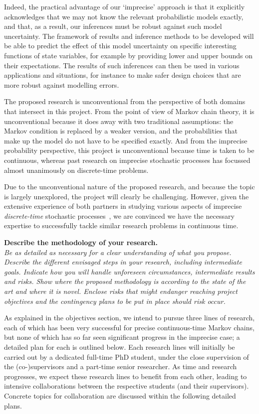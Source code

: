 \documentclass[11pt,dvipsnames,usenames,a4paper]{article}
\begin{document}
Indeed, the practical advantage of our `imprecise' approach is that it explicitly acknowledges that we may not know the relevant probabilistic models exactly, and that, as a result, our inferences must be robust against such model uncertainty. 
The framework of results and inference methods to be developed will be able to predict the effect of this model uncertainty on specific interesting functions of state variables, for example by providing lower and upper bounds on their expectations. 
The results of such inferences can then be used in various applications and situations, for instance to make safer design choices that are more robust against modelling errors.

The proposed research is unconventional from the perspective of both domains that intersect in this project.
From the point of view of Markov chain theory, it is unconventional because it does away with two traditional assumptions: the Markov condition is replaced by a weaker version, and the probabilities that make up the model do not have to be specified exactly. 
And from the imprecise probability perspective, this project is unconventional because time is taken to be continuous, whereas past research on imprecise stochastic processes has focussed almost unanimously on discrete-time problems.

Due to the unconventional nature of the proposed research, and because the topic is largely unexplored, the project will clearly be challenging. 
However, given the extensive experience of both partners in studying various aspects of imprecise \emph{discrete-time} stochastic processes~\cite{cooman2007d,cooman2008,hermans2012,cooman2015:markovergodic}, we are convinced we have the necessary expertise to successfully tackle similar research problems in continuous time.


\vspace{7pt}

\textbf{Describe the methodology of your research.}\\
\textit{Be as detailed as necessary for a clear understanding of what you propose.
Describe the different envisaged steps in your research, including intermediate goals. Indicate how you will handle unforeseen circumstances, intermediate results and risks.
Show where the proposed methodology is according to the state of the art and where it is novel.
Enclose risks that might endanger reaching project objectives and the contingency plans to be put in place should risk occur.}

As explained in the objectives section, we intend to pursue three lines of research, each of which has been very successful for precise continuous-time Markov chains, but none of which has so far seen significant progress in the imprecise case; a detailed plan for each is outlined below. 
Each research lines will initially be carried out by a dedicated full-time PhD student, under the close supervision of the (co-)supervisors and a part-time senior researcher. 
As time and research progresses, we expect these research lines to benefit from each other, leading to intensive collaborations between the respective students (and their supervisors). Concrete topics for collaboration are discussed within the following detailed plans.
\end{document}
